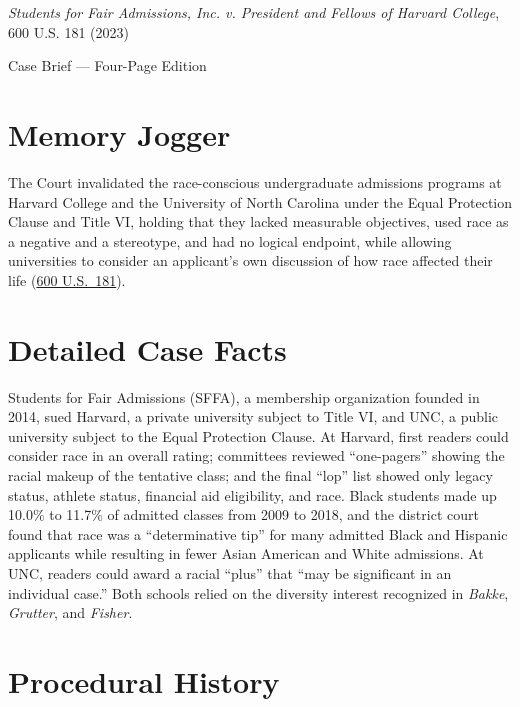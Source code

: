 \documentclass[12pt]{article}
\begin{document}
\begin{center}
{\LARGE \textit{Students for Fair Admissions, Inc. v. President and Fellows of Harvard College}, 600 U.S. 181 (2023)\par}
\vspace{0.8em}
{\large Case Brief --- Four-Page Edition\par}
\end{center}
\vspace{1em}

\section{Memory Jogger}

The Court invalidated the race-conscious undergraduate admissions programs at Harvard College and the University of North Carolina under the Equal Protection Clause and Title VI, holding that they lacked measurable objectives, used race as a negative and a stereotype, and had no logical endpoint, while allowing universities to consider an applicant's own discussion of how race affected their life (\href{https://www.law.cornell.edu/supremecourt/text/20-1199}{600 U.S.\ 181}).

\section{Detailed Case Facts}

Students for Fair Admissions (SFFA), a membership organization founded in 2014, sued Harvard, a private university subject to Title VI, and UNC, a public university subject to the Equal Protection Clause. At Harvard, first readers could consider race in an overall rating; committees reviewed ``one-pagers'' showing the racial makeup of the tentative class; and the final ``lop'' list showed only legacy status, athlete status, financial aid eligibility, and race. Black students made up 10.0\% to 11.7\% of admitted classes from 2009 to 2018, and the district court found that race was a ``determinative tip'' for many admitted Black and Hispanic applicants while resulting in fewer Asian American and White admissions. At UNC, readers could award a racial ``plus'' that ``may be significant in an individual case.'' Both schools relied on the diversity interest recognized in \textit{Bakke}, \textit{Grutter}, and \textit{Fisher}.

\section{Procedural History}
\end{document}
